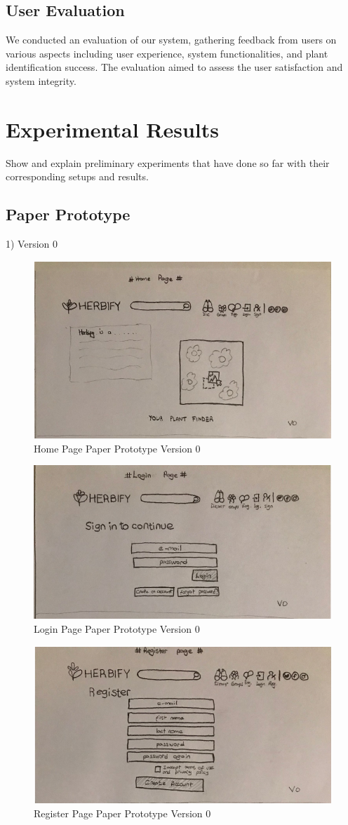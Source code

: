 \documentclass[conference]{IEEEtran}
\begin{document}
\subsection{User Evaluation}We conducted an evaluation of our system, gathering feedback from users on various aspects including user experience, system functionalities, and plant identification success.
The evaluation aimed to assess the user satisfaction and system integrity.



\section{Experimental Results}
Show and explain preliminary experiments that have done so far with their corresponding setups and results. 

\subsection{Paper Prototype}

1) Version 0


\begin{figure}[H]
\centerline{\includegraphics[width=0.48 \textwidth]{images/home0.png}}
\caption{Home Page Paper Prototype Version 0}
\label{fig:graph1}
\end{figure}

\begin{figure}[H]
\centerline{\includegraphics[width=0.48 \textwidth]{images/login0.png}}
\caption{Login Page Paper Prototype Version 0}
\label{fig:graph1}
\end{figure}

\begin{figure}[H]
\centerline{\includegraphics[width=0.48 \textwidth]{images/register0.png}}
\caption{Register Page Paper Prototype Version 0}
\label{fig:graph1}
\end{figure}
\end{document}
